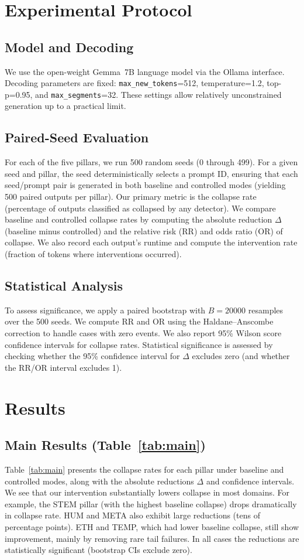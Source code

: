 \documentclass{article}
\begin{document}
\section{Experimental Protocol}
\subsection{Model and Decoding}
We use the open-weight Gemma~7B language model via the Ollama interface. Decoding parameters are fixed: \texttt{max\_new\_tokens}=512, temperature=1.2, top-p=0.95, and \texttt{max\_segments}=32. These settings allow relatively unconstrained generation up to a practical limit.

\subsection{Paired-Seed Evaluation}
For each of the five pillars, we run 500 random seeds (0 through 499). For a given seed and pillar, the seed deterministically selects a prompt ID, ensuring that each seed/prompt pair is generated in both baseline and controlled modes (yielding 500 paired outputs per pillar). Our primary metric is the collapse rate (percentage of outputs classified as collapsed by any detector). We compare baseline and controlled collapse rates by computing the absolute reduction $\Delta$ (baseline minus controlled) and the relative risk (RR) and odds ratio (OR) of collapse. We also record each output's runtime and compute the intervention rate (fraction of tokens where interventions occurred).

\subsection{Statistical Analysis}
To assess significance, we apply a paired bootstrap with $B=20000$ resamples over the 500 seeds. We compute RR and OR using the Haldane--Anscombe correction to handle cases with zero events. We also report 95\% Wilson score confidence intervals for collapse rates. Statistical significance is assessed by checking whether the 95\% confidence interval for $\Delta$ excludes zero (and whether the RR/OR interval excludes 1).

\section{Results}
\subsection{Main Results (Table~\ref{tab:main})}
Table~\ref{tab:main} presents the collapse rates for each pillar under baseline and controlled modes, along with the absolute reductions $\Delta$ and confidence intervals. We see that our intervention substantially lowers collapse in most domains. For example, the STEM pillar (with the highest baseline collapse) drops dramatically in collapse rate. HUM and META also exhibit large reductions (tens of percentage points). ETH and TEMP, which had lower baseline collapse, still show improvement, mainly by removing rare tail failures. In all cases the reductions are statistically significant (bootstrap CIs exclude zero).
\end{document}
